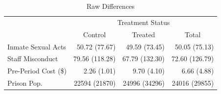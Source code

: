\begin{table}[!h]
\caption{Raw Differences}
\centering
\begin{tabular}{llll}
\cline{1-4}
\multicolumn{1}{r}{} &
  \multicolumn{3}{c}{Treatment Status} \\
\multicolumn{1}{r}{} &
  \multicolumn{1}{c}{Control} &
  \multicolumn{1}{c}{Treated} &
  \multicolumn{1}{c}{Total} \\
\cline{1-4}
\multicolumn{1}{l}{Inmate Sexual Acts} &
  \multicolumn{1}{r}{50.72 (77.67)} &
  \multicolumn{1}{r}{49.59 (73.45)} &
  \multicolumn{1}{r}{50.05 (75.13)} \\
\multicolumn{1}{l}{Staff Misconduct} &
  \multicolumn{1}{r}{79.56 (118.28)} &
  \multicolumn{1}{r}{67.79 (132.30)} &
  \multicolumn{1}{r}{72.60 (126.79)} \\
\multicolumn{1}{l}{Pre-Period Cost (\$)} &
  \multicolumn{1}{r}{2.26 (1.01)} &
  \multicolumn{1}{r}{9.70 (4.10)} &
  \multicolumn{1}{r}{6.66 (4.88)} \\
\multicolumn{1}{l}{Prison Pop.} &
  \multicolumn{1}{r}{22594 (21870)} &
  \multicolumn{1}{r}{24996 (34296)} &
  \multicolumn{1}{r}{24016 (29855)} \\
\cline{1-4}
\end{tabular}
\end{table}
